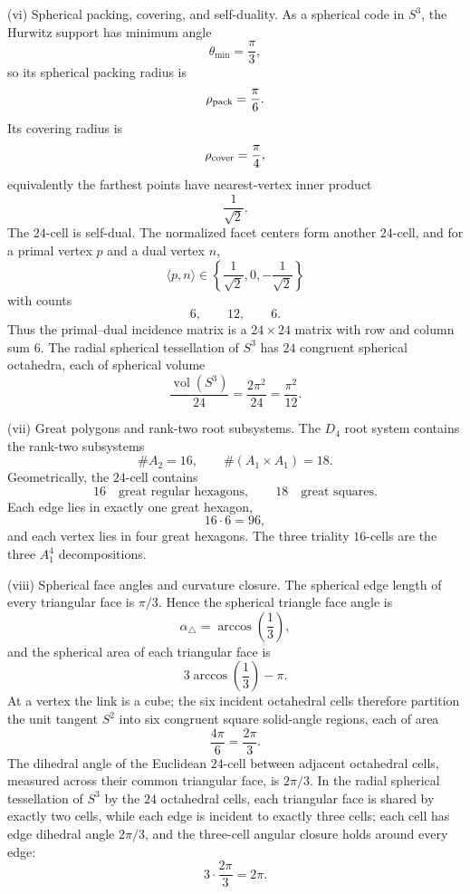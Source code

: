 \documentclass[11pt]{article}
\begin{document}
\begin{theorem}
\smallskip
\noindent\textup{(vi) Spherical packing, covering, and self-duality.}
As a spherical code in \(S^3\), the Hurwitz support has minimum angle
\[
    \theta_{\min}=\frac\pi3,
\]
so its spherical packing radius is
\[
    \rho_{\rm pack}=\frac\pi6.
\]
Its covering radius is
\[
    \rho_{\rm cover}=\frac\pi4,
\]
equivalently the farthest points have nearest-vertex inner product
\[
    \frac1{\sqrt2}.
\]
The \(24\)-cell is self-dual.  The normalized facet centers form another
\(24\)-cell, and for a primal vertex \(p\) and a dual vertex \(n\),
\[
    \langle p,n\rangle\in
    \left\{\frac1{\sqrt2},0,-\frac1{\sqrt2}\right\}
\]
with counts
\[
    6,
    \qquad
    12,
    \qquad
    6.
\]
Thus the primal--dual incidence matrix is a \(24\times24\) matrix with row and
column sum \(6\).  The radial spherical tessellation of \(S^3\) has \(24\)
congruent spherical octahedra, each of spherical volume
\[
    \frac{\operatorname{vol}(S^3)}{24}=\frac{2\pi^2}{24}=\frac{\pi^2}{12}.
\]

\smallskip
\noindent\textup{(vii) Great polygons and rank-two root subsystems.}
The \(D_4\) root system contains the rank-two subsystems
\[
    \#A_2=16,
    \qquad
    \#(A_1\times A_1)=18.
\]
Geometrically, the \(24\)-cell contains
\[
    16\quad\text{great regular hexagons},
    \qquad
    18\quad\text{great squares}.
\]
Each edge lies in exactly one great hexagon,
\[
    16\cdot6=96,
\]
and each vertex lies in four great hexagons.  The three triality
\(16\)-cells are the three \(A_1^4\) decompositions.

\smallskip
\noindent\textup{(viii) Spherical face angles and curvature closure.}
The spherical edge length of every triangular face is \(\pi/3\).  Hence the
spherical triangle face angle is
\[
    \alpha_\triangle=\arccos\!\left(\frac13\right),
\]
and the spherical area of each triangular face is
\[
    3\arccos\!\left(\frac13\right)-\pi.
\]
At a vertex the link is a cube; the six incident octahedral cells therefore
partition the unit tangent \(S^2\) into six congruent square solid-angle regions,
each of area
\[
    \frac{4\pi}{6}=\frac{2\pi}{3}.
\]
The dihedral angle of the Euclidean \(24\)-cell between adjacent octahedral
cells, measured across their common triangular face, is \(2\pi/3\).  In the
radial spherical tessellation of \(S^3\) by the \(24\) octahedral cells, each
triangular face is shared by exactly two cells, while each edge is incident to
exactly three cells; each cell has edge dihedral angle \(2\pi/3\), and the
three-cell angular closure holds around every edge:
\[
    3\cdot\frac{2\pi}{3}=2\pi.
\]


\end{theorem}
\end{document}
